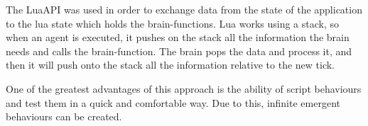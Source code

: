The LuaAPI was used in order to exchange data from the state of the application to the lua state which holds the brain-functions. Lua works using a stack, so when an agent is executed, it pushes on the stack all the information the brain needs and calls the brain-function. The brain pops the data and process it, and then it will push onto the stack all the information relative to the new tick. \citep{lua}

One of the greatest advantages of this approach is the ability of script behaviours and test them in a quick and comfortable way. Due to this, infinite emergent behaviours can be created.

\ifx\isEmbedded\undefined


\pagebreak

\fi